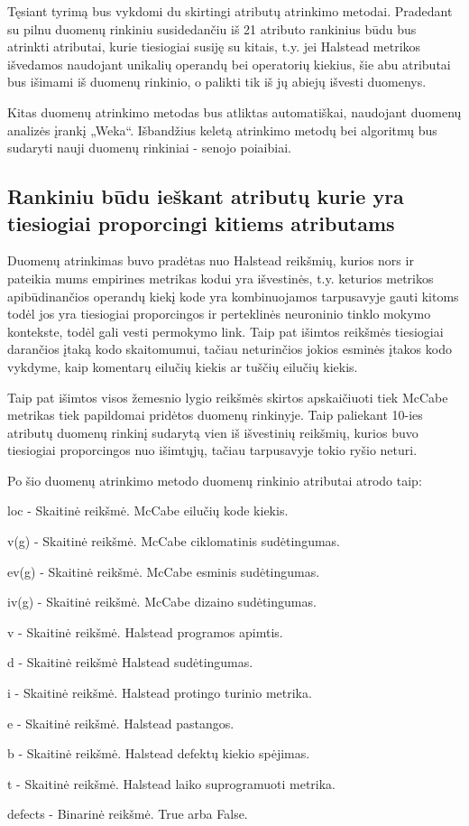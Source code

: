 \documentclass{VUMIFPSbakalaurinis}
\begin{document}
Tęsiant tyrimą bus vykdomi du skirtingi atributų atrinkimo metodai. Pradedant su pilnu duomenų rinkiniu susidedančiu iš 21 atributo rankinius būdu bus atrinkti atributai, kurie tiesiogiai susiję su kitais, t.y. jei Halstead metrikos išvedamos naudojant unikalių operandų bei operatorių kiekius, šie abu atributai bus išimami iš duomenų rinkinio, o palikti tik iš jų abiejų išvesti duomenys.

Kitas duomenų atrinkimo metodas bus atliktas automatiškai, naudojant duomenų analizės įrankį „Weka“. Išbandžius keletą atrinkimo metodų bei algoritmų bus sudaryti nauji duomenų rinkiniai - senojo poiaibiai.

\subsection{Rankiniu būdu ieškant atributų kurie yra tiesiogiai proporcingi kitiems atributams}

Duomenų atrinkimas buvo pradėtas nuo Halstead reikšmių, kurios nors ir pateikia mums empirines metrikas kodui yra išvestinės, t.y. keturios metrikos apibūdinančios operandų kiekį kode yra kombinuojamos tarpusavyje gauti kitoms todėl jos yra tiesiogiai proporcingos ir perteklinės neuroninio tinklo mokymo kontekste, todėl gali vesti permokymo link. Taip pat išimtos reikšmės tiesiogiai darančios įtaką kodo skaitomumui, tačiau neturinčios jokios esminės įtakos kodo vykdyme, kaip komentarų eilučių kiekis ar tuščių eilučių kiekis.

Taip pat išimtos visos žemesnio lygio reikšmės skirtos apskaičiuoti tiek McCabe metrikas tiek papildomai pridėtos duomenų rinkinyje. Taip paliekant 10-ies atributų duomenų rinkinį sudarytą vien iš išvestinių reikšmių, kurios buvo tiesiogiai proporcingos nuo išimtųjų, tačiau tarpusavyje tokio ryšio neturi.

Po šio duomenų atrinkimo metodo duomenų rinkinio atributai atrodo taip:
\begin{description} 
\item loc - Skaitinė reikšmė. McCabe eilučių kode kiekis.
\item v(g) - Skaitinė reikšmė. McCabe ciklomatinis sudėtingumas.
\item ev(g) - Skaitinė reikšmė. McCabe esminis sudėtingumas.
\item iv(g) - Skaitinė reikšmė. McCabe dizaino sudėtingumas.
\item v - Skaitinė reikšmė. Halstead programos apimtis.
\item d - Skaitinė reikšmė Halstead sudėtingumas.
\item i - Skaitinė reikšmė. Halstead protingo turinio metrika.
\item e - Skaitinė reikšmė. Halstead pastangos.
\item b - Skaitinė reikšmė. Halstead defektų kiekio spėjimas.
\item t - Skaitinė reikšmė. Halstead laiko suprogramuoti metrika.
\item defects - Binarinė reikšmė. True arba False.
\end{description} 
\end{document}
